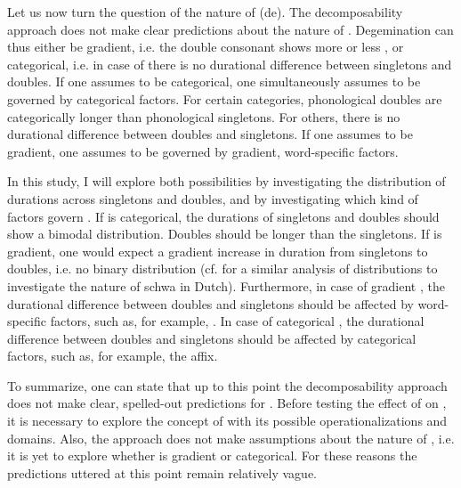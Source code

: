 {{%
Let us now turn the question of the nature of (de). The decomposability approach does not make clear predictions about the nature of . Degemination can thus either be gradient, i.e. the double consonant shows more or less , or categorical, i.e. in case of  there is no durational difference between singletons and doubles. %
If one assumes  to be categorical, one simultaneously assumes  to be governed by categorical factors. For certain categories, phonological doubles are categorically longer than phonological singletons. For others, there is no durational difference between doubles and singletons. 
If one assumes  to be gradient, one assumes  to be governed by gradient, word-specific factors.

In this study, I will explore both possibilities by investigating the distribution of durations across singletons and doubles, and by investigating which kind of factors govern . %
If  is categorical, the durations of singletons and doubles should show a bimodal distribution. Doubles should be longer than the singletons. If  is gradient, one would expect a gradient increase in duration from singletons to doubles, i.e. no binary distribution (cf.  \cite{Hanique.06.03.2013} for a similar analysis of distributions to investigate the nature of schwa  in Dutch). Furthermore, in case of gradient , the durational difference between doubles and singletons should be affected by word-specific factors, such as, for example, . In case of categorical , the durational difference between doubles and singletons should be affected by categorical factors, such as, for example, the affix.
 


To summarize, one can state that up to this point the decomposability approach does not make clear, spelled-out predictions for . Before testing the effect of  on , it is necessary to explore the concept of  with its possible operationalizations and domains. Also, the approach does not make assumptions about the nature of , i.e. it is yet to explore whether  is gradient or categorical. 
For these reasons the predictions uttered at this point remain relatively vague. 

}}
